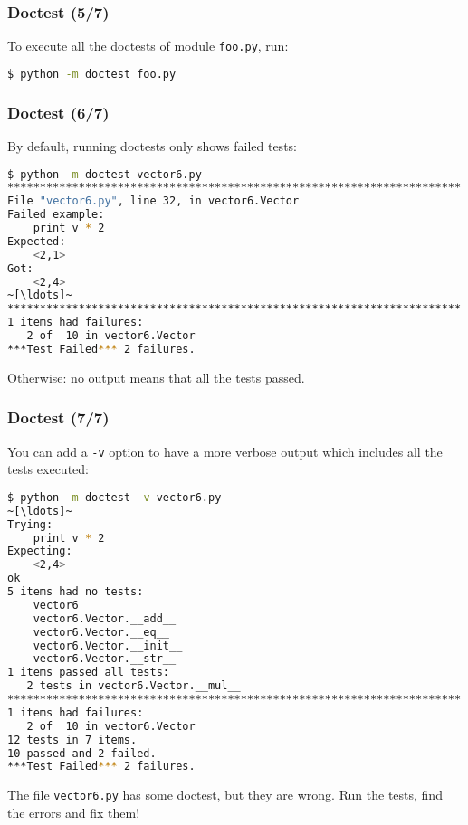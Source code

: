 \documentclass[english,serif,mathserif,xcolor=pdftex,dvipsnames,table]{beamer}
\begin{document}
\begin{frame}
  \frametitle{Doctest (5/7)}

  To execute all the doctests of module \texttt{foo.py}, run:

  \+
\begin{lstlisting}[language=sh]
$ python -m doctest foo.py
\end{lstlisting}
\end{frame}


\begin{frame}[fragile]
  \frametitle{Doctest (6/7)}

  By default, running doctests only shows failed tests:
\begin{lstlisting}[language=sh,basicstyle=\footnotesize\ttfamily]
$ python -m doctest vector6.py
**********************************************************************
File "vector6.py", line 32, in vector6.Vector
Failed example:
    print v * 2
Expected:
    <2,1>
Got:
    <2,4>
~[\ldots]~
**********************************************************************
1 items had failures:
   2 of  10 in vector6.Vector
***Test Failed*** 2 failures.
\end{lstlisting}
  Otherwise: no output means that all the tests passed.
\end{frame}

\begin{frame}[fragile]
  \frametitle{Doctest (7/7)}

  You can add a \lstinline|-v| option to have a more verbose output
  which includes all the tests executed:
\begin{lstlisting}[language=sh,basicstyle=\ttfamily\scriptsize]
$ python -m doctest -v vector6.py
~[\ldots]~
Trying:
    print v * 2
Expecting:
    <2,4>
ok
5 items had no tests:
    vector6
    vector6.Vector.__add__
    vector6.Vector.__eq__
    vector6.Vector.__init__
    vector6.Vector.__str__
1 items passed all tests:
   2 tests in vector6.Vector.__mul__
**********************************************************************
1 items had failures:
   2 of  10 in vector6.Vector
12 tests in 7 items.
10 passed and 2 failed.
***Test Failed*** 2 failures.
\end{lstlisting}
\end{frame}


\begin{frame}
\+
\begin{exercise}
  The file
  \href{https://raw.github.com/gc3-uzh-ch/python-course/master/vector6.py}{\texttt{vector6.py}}
  has some doctest, but they are wrong. Run the tests, find the errors
  and fix them!
\end{exercise}

\end{frame}
\end{document}
